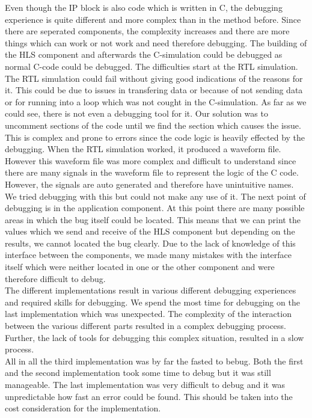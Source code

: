 \documentclass[conference]{IEEEtran}
\begin{document}
Even though the IP block is also code which is written in C, the debugging experience is quite different and more complex than in the method before. Since there are seperated components, the complexity increases and there are more things which can work or not work and need therefore debugging. The building of the HLS component and afterwards the C-simulation could be debugged as normal C-code could be debugged. The difficulties start at the RTL simulation. The RTL simulation could fail without giving good indications of the reasons for it. This could be due to issues in transfering data or because of not sending data or for running into a loop which was not cought in the C-simulation. As far as we could see, there is not even a debugging tool for it. Our solution was to uncomment sections of the code until we find the section which causes the issue. This is complex and prone to errors since the code logic is heavily effected by the debugging. When the RTL simulation worked, it produced a waveform file. However this waveform file was more complex and difficult to understand since there are many signals in the waveform file to represent the logic of the C code. However, the signals are auto generated and therefore have unintuitive names. We tried debugging with this but could not make any use of it. The next point of debugging is in the application component. At this point there are many possible areas in which the bug itself could be located. This means that we can print the values which we send and receive of the HLS component but depending on the results, we cannot located the bug clearly. Due to the lack of knowledge of this interface between the components, we made many mistakes with the interface itself which were neither located in one or the other component and were therefore difficult to debug. \\
The different implementations result in various different debugging experiences and required skills for debugging. We spend the most time for debugging on the last implementation which was unexpected. The complexity of the interaction between the various different parts resulted in a complex debugging process. Further, the lack of tools for debugging this complex situation, resulted in a slow process. \\
All in all the third implementation was by far the fasted to bebug. Both the first and the second implementation took some time to debug but it was still manageable. The last implementation was very difficult to debug and it was unpredictable how fast an error could be found. This should be taken into the cost consideration for the implementation.
\end{document}
